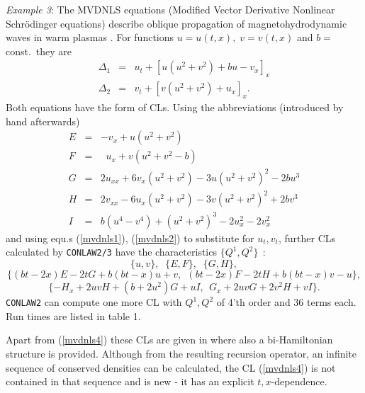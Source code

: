 {\it Example 3}: \newline
The MVDNLS equations (Modified Vector Derivative Nonlinear Schr\"{o}dinger
equations) describe oblique propagation of magnetohydrodynamic waves in
warm plasmas \cite{NS}. For
functions $u = u(t,x), \; v = v(t,x)$ and $b = $ const.\ they are
\begin{eqnarray}
\Delta_1 & = & u_t + [u(u^2+v^2) + bu - v_x]_x \label{mvdnls1} \\
\Delta_2 & = & v_t + [v(u^2+v^2) + u_x]_x.      \label{mvdnls2}
\end{eqnarray}
Both equations have the form of CLs. Using the abbreviations (introduced
by hand afterwards)
\begin{eqnarray*}
E & = &   - v_x+u(u^2+v^2  ) \\
F & = & \;\;u_x+v(u^2+v^2-b) \\
G & = & 2u_{xx}+6v_x(u^2+v^2)-3u(u^2+v^2)^2-2bu^3 \\
H & = & 2v_{xx}-6u_x(u^2+v^2)-3v(u^2+v^2)^2+2bv^3 \\
I & = & b(u^4-v^4)+(u^2+v^2)^3-2u_x^2-2v_x^2
\end{eqnarray*}
and using equ.s (\ref{mvdnls1}), (\ref{mvdnls2}) to substitute
for $u_t, v_t$,
further CLs calculated by {\tt CONLAW2/3} have the characteristics
$\{Q^1,Q^2\}\;\,$:
\begin{equation} \{u, v\},\;\; \{E, F\},\;\; \{G, H\}, \label{mvdnls3} 
\end{equation}
\vspace{-5mm} 
\begin{equation} \{(bt-2x)E-2tG+b(bt-x)u+v,\;\, (bt-2x)F-2tH+b(bt-x)v-u\}, 
\label{mvdnls4} \end{equation}
\vspace{-3mm} 
\begin{equation}
\{-H_x+2uvH+(b+2u^2)G+uI,\;\, G_x+2uvG+2v^2H+vI \}. 
\label{mvdnls5} \end{equation}
{\tt CONLAW2} can compute one more CL with $Q^1, Q^2$ of 4'th order
and 36 terms each. Run times are listed in table 1.

Apart from (\ref{mvdnls4}) these CLs are given in \cite{NS} 
where also a bi-Hamiltonian structure is provided.
Although from the resulting recursion operator, an infinite sequence
of conserved densities can be calculated, the CL (\ref{mvdnls4}) is not
contained in that sequence and is new - it has an explicit
$t,x$-dependence. 

